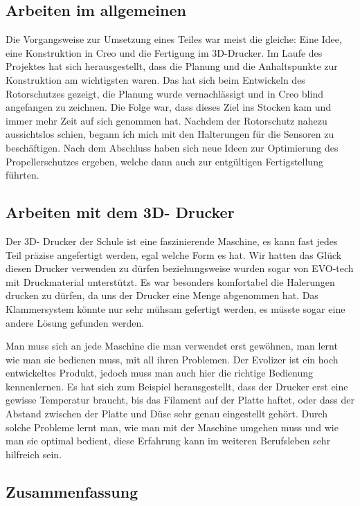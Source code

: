 	\subsection{Arbeiten im allgemeinen}

	Die Vorgangsweise zur Umsetzung eines Teiles war meist die gleiche: Eine Idee, eine Konstruktion in Creo und die Fertigung im 3D-Drucker.
	Im Laufe des Projektes hat sich herausgestellt, dass die Planung und die Anhaltspunkte zur Konstruktion am wichtigsten waren.
	Das hat sich beim Entwickeln des Rotorschutzes gezeigt, die Planung wurde vernachlässigt und in Creo blind angefangen zu zeichnen.
	Die Folge war, dass dieses Ziel ins Stocken kam und immer mehr Zeit auf sich genommen hat.
	Nachdem der Rotorschutz nahezu aussichtslos schien, begann ich mich mit den Halterungen für die Sensoren zu beschäftigen.
	Nach dem Abschluss haben sich neue Ideen zur Optimierung des Propellerschutzes ergeben, welche dann auch zur entgültigen Fertigstellung führten.

	\subsection{Arbeiten mit dem 3D- Drucker}

	Der 3D- Drucker der Schule ist eine faszinierende Maschine, es kann fast jedes Teil präzise angefertigt werden, egal welche Form es hat.
	Wir hatten das Glück diesen Drucker verwenden zu dürfen beziehungsweise wurden sogar von EVO-tech mit Druckmaterial unterstützt.
	Es war besonders komfortabel die Halerungen drucken zu dürfen, da uns der Drucker eine Menge abgenommen hat.
	Das Klammersystem könnte nur sehr mühsam gefertigt werden, es müsste sogar eine andere Lösung gefunden werden.

	Man muss sich an jede Maschine die man verwendet erst gewöhnen, man lernt wie man sie bedienen muss, mit all ihren Problemen.
	Der Evolizer ist ein hoch entwickeltes Produkt, jedoch muss man auch hier die richtige Bedienung kennenlernen.
	Es hat sich zum Beispiel herausgestellt, dass der Drucker erst eine gewisse Temperatur braucht, bis das Filament auf der Platte haftet, oder dass der Abstand zwischen der Platte und Düse sehr genau eingestellt gehört.
	Durch solche Probleme lernt man, wie man mit der Maschine umgehen muss und wie man sie optimal bedient, diese Erfahrung kann im weiteren Berufsleben sehr hilfreich sein.

	\subsection{Zusammenfassung}

